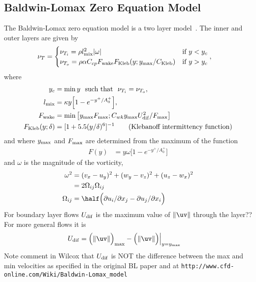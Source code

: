 \clearpage
\subsection{Baldwin-Lomax Zero Equation Model}\label{sec:BaldwinLomax}
\newcommand{\ymax}{y_{\rm max}}
\newcommand{\Fmax}{F_{\rm max}}

The Baldwin-Lomax zero equation model is a two layer model~\cite{Wilcox}.
The inner and outer layers are given by
\begin{align*}
  \nu_T &= \begin{cases}
  \nu_{T_i} = \rho l_{\rm mix}^2 \vert \omega \vert & \text{if $y< y_c$} \\
  \nu_{T_o} = \rho \alpha C_{cp} F_{\rm wake} F_{\rm Kleb}(y;y_{\rm max}/C_{\rm Kleb}) & \text{if $y> y_c$} \\
  \end{cases} , 
\end{align*}
where
\begin{align*}
  y_c &= \min y ~~\text{such that}~~ \nu_{T_i} = \nu_{T_o}, \\
  l_{\rm mix} &= \kappa  y \Big[ 1 - e^{-y^+/A_0^+} \Big] , \\
  F_{\rm wake} &= \min\left[y_{\rm max} F_{\rm max}; C_{wk} y_{\rm max} U_{\rm dif}^2/F_{\rm max} \right] \\
  F_{\rm Kleb}(y;\delta) &= [ 1 + 5.5 (y/\delta)^6 ] ^{-1} \qquad \mbox{(Klebanoff intermittency function)} 
\end{align*}
and where $\ymax$ and $\Fmax$ are determined from the maximum of the function
\begin{align*}
  F(y) &= y \omega \Big[ 1 - e^{-y^+/A_0^+} \Big]
\end{align*}
and $\omega$ is the magnitude of the vorticity,
\begin{align*}
  \omega^2  &= (v_x-u_y)^2 + (w_y-v_z)^2 + (u_z-w_x)^2  \\
            &= 2 \Omega_{ij}\Omega_{ij} \\
     \Omega_{ij} &= \half\Big( \partial u_i/\partial x_j - \partial u_j/\partial x_i \Big)
\end{align*}
For boundary layer flows $U_{\rm dif}$ is the maximum value of $\| \uv \|$ through the layer??
For more general flows it is
\begin{align*}
  U_{\rm dif} &= \Big( \| \uv \| \Big)_{\rm max} - \Big( \| \uv \| \Big)\Big\vert_{y=\ymax}
\end{align*}
Note comment in Wilcox that $U_{\rm dif}$ is NOT the difference between the max and min velocities
as specified in the original BL paper and at {\tt http://www.cfd-online.com/Wiki/Baldwin-Lomax\_model}

